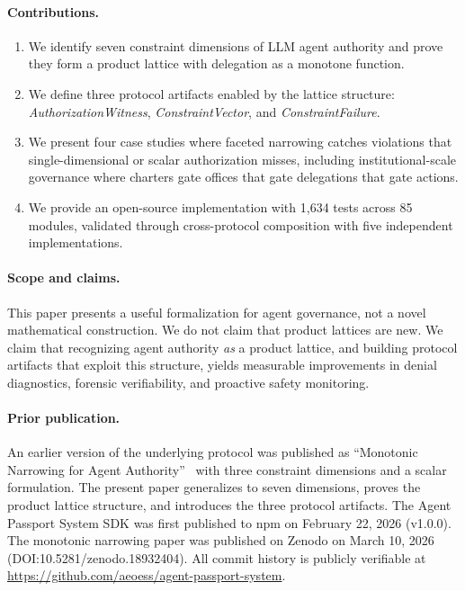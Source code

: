 \documentclass[sigconf,nonacm]{acmart}
\begin{document}
\paragraph{Contributions.}
\begin{enumerate}
\item We identify seven constraint dimensions of LLM agent authority and prove they form
      a product lattice with delegation as a monotone function.
\item We define three protocol artifacts enabled by the lattice structure:
      \emph{AuthorizationWitness}, \emph{ConstraintVector}, and \emph{ConstraintFailure}.
\item We present four case studies where faceted narrowing catches violations that
      single-dimensional or scalar authorization misses, including institutional-scale
      governance where charters gate offices that gate delegations that gate actions.
\item We provide an open-source implementation with 1,634 tests across 85 modules,
      validated through cross-protocol composition with five independent implementations.
\end{enumerate}

\paragraph{Scope and claims.} This paper presents a useful formalization for agent
governance, not a novel mathematical construction. We do not claim that product lattices
are new. We claim that recognizing agent authority \emph{as} a product lattice, and
building protocol artifacts that exploit this structure, yields measurable improvements
in denial diagnostics, forensic verifiability, and proactive safety monitoring.

\paragraph{Prior publication.} An earlier version of the underlying protocol was published
as ``Monotonic Narrowing for Agent Authority''~\cite{aeoess2026} with three constraint
dimensions and a scalar formulation. The present paper generalizes to seven dimensions,
proves the product lattice structure, and introduces the three protocol artifacts.
The Agent Passport System SDK was first published to npm on February 22, 2026 (v1.0.0).
The monotonic narrowing paper was published on Zenodo on March 10, 2026
(DOI:10.5281/zenodo.18932404). All commit history is publicly verifiable at
\url{https://github.com/aeoess/agent-passport-system}.
\end{document}
